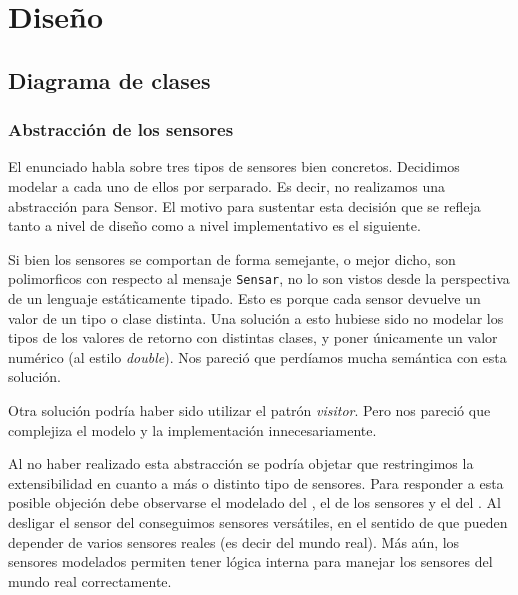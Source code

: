 \section{Dise\~no}

  \subsection{Diagrama de clases}

      \subsubsection{Abstracci\'on de los sensores}
          El enunciado habla sobre tres tipos de sensores bien concretos.
          Decidimos modelar a cada uno de ellos por serparado. Es decir, no realizamos
          una abstracci\'on para Sensor. El motivo para sustentar esta decisi\'on
          que se refleja tanto a nivel de dise\~no como a nivel implementativo es
          el siguiente.

          Si bien los sensores se comportan de forma semejante,
          o mejor dicho, son polimorficos con respecto al mensaje \texttt{Sensar},
          no lo son vistos desde la perspectiva de un lenguaje est\'aticamente tipado.
          Esto es porque cada sensor devuelve un valor de un tipo o clase distinta.
          Una soluci\'on a esto hubiese sido no modelar los tipos de los valores de
          retorno con distintas clases, y poner \'unicamente un valor num\'erico
          (al estilo \textit{double}). Nos
          pareci\'o que perd\'iamos mucha sem\'antica con esta soluci\'on.

          Otra soluci\'on podr\'ia haber sido utilizar el patr\'on \textit{visitor}.
          Pero nos pareci\'o que complejiza el modelo y la implementaci\'on innecesariamente.

          Al no haber realizado esta abstracci\'on se podr\'ia objetar que restringimos
          la extensibilidad en cuanto a m\'as o distinto tipo de sensores.
          Para responder a esta posible objeci\'on debe observarse el modelado del
          \condiciones{}, el de los sensores y el del
          \arduino{}. Al desligar el sensor del \arduino{} conseguimos
          sensores vers\'atiles, en el sentido de que pueden depender de varios sensores
          reales (es decir del mundo real). M\'as a\'un, los sensores modelados
          permiten tener l\'ogica interna para manejar los sensores del mundo real
          correctamente.

